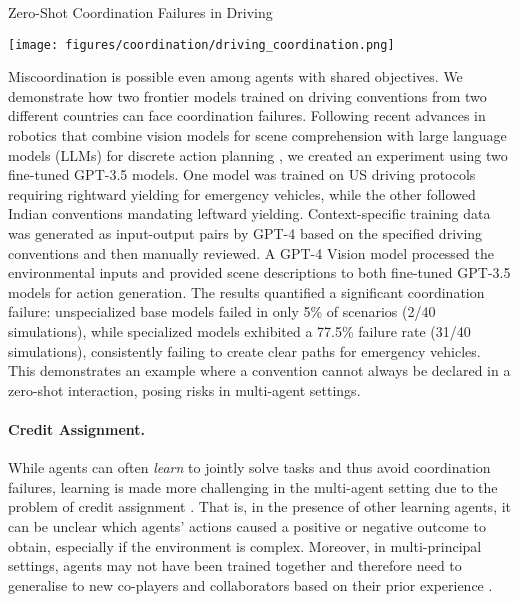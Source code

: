 \begin{case-study}[label=cs:coordination_driving]{Zero-Shot Coordination Failures in Driving}
  \begin{center}
    \texttt{[image: figures/coordination/driving\_coordination.png]}
  \end{center}
  \vspace{1em}
  Miscoordination is possible even among agents with shared objectives. We demonstrate how two frontier models trained on driving conventions from two different countries can face coordination failures. Following recent advances in robotics that combine vision models for scene comprehension with large language models (LLMs) for discrete action planning \citep[e.g.,][]{open_x_embodiment_rt_x_2023}, we created an experiment using two fine-tuned GPT-3.5 models. One model was trained on US driving protocols requiring rightward yielding for emergency vehicles, while the other followed Indian conventions mandating leftward yielding. Context-specific training data was generated as input-output pairs by GPT-4 based on the specified driving conventions and then manually reviewed. A GPT-4 Vision model processed the environmental inputs and provided scene descriptions to both fine-tuned GPT-3.5 models for action generation. The results quantified a significant coordination failure: unspecialized base models failed in only 5\% of scenarios (2/40 simulations), while specialized models exhibited a 77.5\% failure rate (31/40 simulations), consistently failing to create clear paths for emergency vehicles. This demonstrates an example where a convention cannot always be declared in a zero-shot interaction, posing risks in multi-agent settings. 
\end{case-study}

\paragraph{Credit Assignment.}
While agents can often \emph{learn} to jointly solve tasks and thus avoid coordination failures, learning is made more challenging in the multi-agent setting due to the problem of {credit assignment} \citep[see also  on information asymmetries and , which discusses distributional shift]{Du2023, li2025multiagent}.
That is, in the presence of other learning agents, it can be unclear which agents' actions caused a positive or negative outcome to obtain, especially if the environment is complex.
Moreover, in multi-principal settings, agents may not have been trained together and therefore need to generalise to new co-players and collaborators based on their prior experience \citep{Stone2010,Leibo2021-cf,Agapiou2022-an}.

